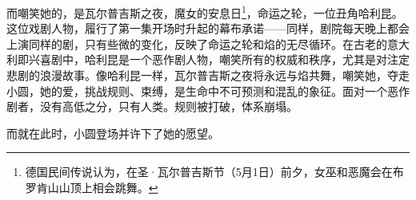 而嘲笑她的，是瓦尔普吉斯之夜，魔女的安息日\footnote{德国民间传说认为，在圣·瓦尔普吉斯节（5月1日）前夕，女巫和恶魔会在布罗肯山山顶上相会跳舞。}\cite{ref69}，命运之轮，一位丑角哈利昆。这位戏剧人物，履行了第一集开场时升起的幕布承诺——同样，剧院每天晚上都会上演同样的剧，只有些微的变化，反映了命运之轮和焰的无尽循环。在古老的意大利即兴喜剧中，哈利昆是一个恶作剧人物，嘲笑所有的权威和秩序，尤其是对注定悲剧的浪漫故事\cite{ref70}。像哈利昆一样，瓦尔普吉斯之夜将永远与焰共舞，嘲笑她，夺走小圆，她的爱，挑战规则、束缚，是生命中不可预测和混乱的象征。面对一个恶作剧者，没有高低之分，只有人类。规则被打破，体系崩塌。

而就在此时，小圆登场并许下了她的愿望。
